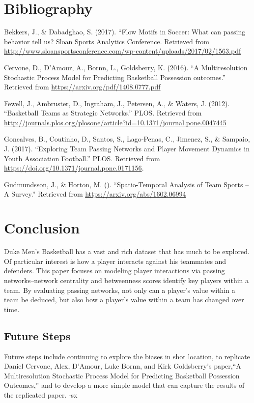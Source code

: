 \documentclass[12pt,twoside]{dukestatscithesis}
\theoremstyle{definition}
\theoremstyle{definition}
\theoremstyle{definition}
\theoremstyle{remark}
\begin{document}
\chapter{Bibliography}\label{bibliography}

Bekkers, J., \& Dabadghao, S. (2017). ``Flow Motifs in Soccer: What can
passing behavior tell us? Sloan Sports Analytics Conference. Retrieved
from
\url{http://www.sloansportsconference.com/wp-content/uploads/2017/02/1563.pdf}

Cervone, D., D'Amour, A., Bornn, L., Goldsberry, K. (2016). ``A
Multiresolution Stochastic Process Model for Predicting Basketball
Possession outcomes.'' Retrieved from
\url{https://arxiv.org/pdf/1408.0777.pdf}

Fewell, J., Ambruster, D., Ingraham, J., Petersen, A., \& Waters, J.
(2012). ``Basketball Teams as Strategic Networks.'' PLOS. Retrieved from
\url{http://journals.plos.org/plosone/article?id=10.1371/journal.pone.0047445}

Goncalves, B., Coutinho, D., Santos, S., Lago-Penas, C., Jimenez, S., \&
Sampaio, J. (2017). ``Exploring Team Passing Networks and Player
Movement Dynamics in Youth Association Football.'' PLOS. Retrieved from
\url{https://doi.org/10.1371/journal.pone.0171156}.

Gudmundsson, J., \& Horton, M. (). ``Spatio-Temporal Analysis of Team
Sports -- A Survey.'' Retrieved from
\url{https://arxiv.org/abs/1602.06994}

\chapter{Conclusion}\label{conclusion-1}

Duke Men's Basketball has a vast and rich dataset that has much to be
explored. Of particular interest is how a player interacts against his
teammates and defenders. This paper focuses on modeling player
interactions via passing networks--network centrality and betweenness
scores identify key players within a team. By evaluating passing
networks, not only can a player's value within a team be deduced, but
also how a player's value within a team has changed over time.

\section{Future Steps}\label{future-steps-1}

Future steps include continuing to explore the biases in shot location,
to replicate Daniel Cervone, Alex, D'Amour, Luke Bornn, and Kirk
Goldsberry's paper,``A Multiresolution Stochastic Process Model for
Predicting Basketball Possession Outcomes,'' and to develop a more
simple model that can capture the results of the replicated paper. -sx
\end{document}
